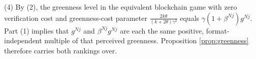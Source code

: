 \documentclass[preprint,review,12pt,authoryear,nopreprintline]{elsarticle}
\theoremstyle{definition}
\begin{document}
(4) By (2), the greenness level in the equivalent blockchain game with zero verification cost and greenness-cost parameter $\frac{2k\theta}{(k+2\theta)\gamma^2}$ equals $\gamma(1+\beta^{Nj})g^{Nj}$. Part (1) implies that $g^{Nj}$ and $\beta^{Nj}g^{Nj}$ are each the same positive, format-independent multiple of that perceived greenness. Proposition \ref{prop:greenness} therefore carries both rankings over.



\end{document}
